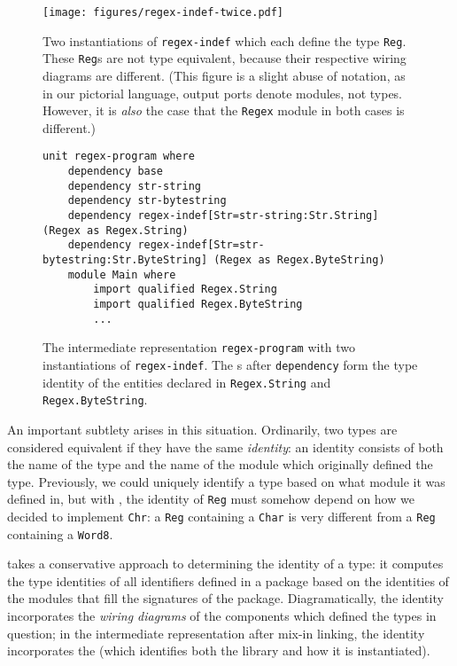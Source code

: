 \begin{figure}
\center\texttt{[image: figures/regex-indef-twice.pdf]}
\caption{Two instantiations of \texttt{regex-indef} which each define
the type
\texttt{Reg}.  These \texttt{Reg}s are not type equivalent, because
their respective wiring diagrams are different.  (This figure is
a slight abuse of notation, as in our pictorial language, output ports
denote modules, not types.  However, it is \emph{also} the case that the
\texttt{Regex} module in both cases is different.)}
\label{fig:regex-indef-twice}
\end{figure}

\begin{figure}
\begin{lstlisting}
unit regex-program where
    dependency base
    dependency str-string
    dependency str-bytestring
    dependency regex-indef[Str=str-string:Str.String] (Regex as Regex.String)
    dependency regex-indef[Str=str-bytestring:Str.ByteString] (Regex as Regex.ByteString)
    module Main where
        import qualified Regex.String
        import qualified Regex.ByteString
        ...
\end{lstlisting}
\caption{The intermediate representation \texttt{regex-program} with two instantiations of \texttt{regex-indef}.  The \uid{}s after \texttt{dependency} form the type identity of the entities declared in \texttt{Regex.String} and \texttt{Regex.ByteString}.}
\label{fig:matcher-twice-bkp}
\end{figure}

An important subtlety arises in this situation.  Ordinarily, two types
are considered equivalent if they have the same \emph{identity}: an
identity consists of both the name of the type and the name of the
module which originally defined the type.  Previously, we could
uniquely identify a type based on what module it was defined in,
but with \Backpack{}, the identity of \verb|Reg| must somehow
depend on how we decided to implement \verb|Chr|: a \verb|Reg|
containing a \verb|Char| is very different from a \verb|Reg| containing
a \verb|Word8|.

\Backpack{} takes a conservative approach to determining the
identity of a type: it computes the type identities of all identifiers
defined in a package based on the identities of the modules that fill
the signatures of the package.  Diagramatically, the identity
incorporates the \emph{wiring diagrams} of the components which defined
the types in question; in the intermediate representation after mix-in
linking, the identity incorporates the \uid{} (which
identifies both the library and how it is instantiated).

